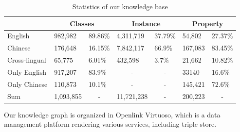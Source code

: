 \documentclass[runningheads,a4paper]{llncs}
\begin{document}
\begin{table}[h]
\small
\centering
\caption{Statistics of our knowledge base}
\label{tab:kb-result}
\begin{tabular}{|l|l|l|l|l|l|l|}
\hline
\multicolumn{1}{|c|}{} & \multicolumn{2}{c|}{Classes}      & \multicolumn{2}{c|}{Instance}                   & \multicolumn{2}{c|}{Property}    \\ \hline
English                & 982,982   & 89.86\%                & 4,311,719              & 37.79\%                & 54,802  & 27.37\%                \\ \hline
Chinese                & 176,648   & 16.15\%                & 7,842,117              & 66.9\%                 & 167,083 & 83.45\%                \\ \hline
Cross-lingual          & 65,775    & 6.01\%                 & 432,598                & 3.7\%                  & 21,662  & 10.82\%                \\ \hline
Only English           & 917,207   & 83.9\%                 & \multicolumn{1}{c|}{-} & \multicolumn{1}{c|}{-} & 33140   & 16.6\%                 \\ \hline
Only Chinese           & 110,873   & 10.1\%                 & \multicolumn{1}{c|}{-} & \multicolumn{1}{c|}{-} & 145,421 & 72.6\%                 \\ \hline
Sum                    & 1,093,855 & \multicolumn{1}{c|}{-} & 11,721,238             & \multicolumn{1}{c|}{-} & 200,223 & \multicolumn{1}{c|}{-} \\ \hline
\end{tabular}
\end{table}

Our knowledge graph is organized in Openlink Virtuoso, which is a data management platform rendering various services, including triple store.
\end{document}
